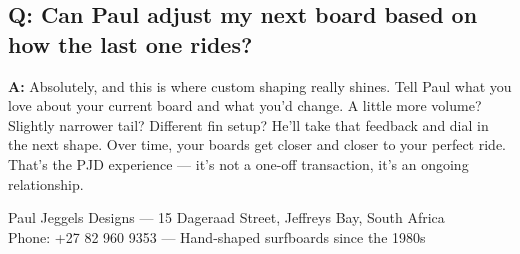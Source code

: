 \documentclass[11pt,a4paper]{article}
\newcommand{\question}[1]{\subsection*{Q: #1}}
\newcommand{\answer}{\noindent\textbf{A:} }
\begin{document}
\question{Can Paul adjust my next board based on how the last one rides?}
\answer Absolutely, and this is where custom shaping really shines. Tell Paul what you love about your current board and what you'd change. A little more volume? Slightly narrower tail? Different fin setup? He'll take that feedback and dial in the next shape. Over time, your boards get closer and closer to your perfect ride. That's the PJD experience --- it's not a one-off transaction, it's an ongoing relationship.

\vfill
\begin{center}
\small\color{gray}
Paul Jeggels Designs --- 15 Dageraad Street, Jeffreys Bay, South Africa\\
Phone: +27 82 960 9353 --- Hand-shaped surfboards since the 1980s
\end{center}
\end{document}

